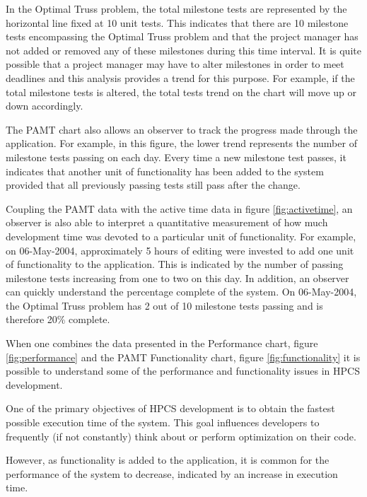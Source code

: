 In the Optimal Truss problem, the total milestone tests are
represented by the horizontal line fixed at 10 unit tests.  This
indicates that there are 10 milestone tests encompassing the Optimal
Truss problem and that the project manager has not added or removed
any of these milestones during this time interval.  It is quite
possible that a project manager may have to alter milestones in order
to meet deadlines and this analysis provides a trend for this purpose.
For example, if the total milestone tests is altered, the total tests
trend on the chart will move up or down accordingly.

The PAMT chart also allows an observer to track the progress made
through the application.  For example, in this figure, the lower trend
represents the number of milestone tests passing on each day.  Every
time a new milestone test passes, it indicates that another unit of
functionality has been added to the system provided that all
previously passing tests still pass after the change.

Coupling the PAMT data with the active time data in figure
\ref{fig:activetime}, an observer is also able to interpret a
quantitative measurement of how much development time was devoted to a
particular unit of functionality.  For example, on 06-May-2004,
approximately 5 hours of editing were invested to add one unit of
functionality to the application.  This is indicated by the number of
passing milestone tests increasing from one to two on this day.  In
addition, an observer can quickly understand the percentage complete
of the system.  On 06-May-2004, the Optimal Truss problem has 2 out of
10 milestone tests passing and is therefore 20\% complete.

\label{sec:appperfvsfunctionality}

When one combines the data presented in the Performance chart, figure
\ref{fig:performance} and the PAMT Functionality chart, figure
\ref{fig:functionality} it is possible to understand some of the
performance and functionality issues in HPCS development.

One of the primary objectives of HPCS development is to obtain the
fastest possible execution time of the system.  This goal influences
developers to frequently (if not constantly) think about or perform
optimization on their code.

However, as functionality is added to the application, it is common
for the performance of the system to decrease, indicated by an
increase in execution time.

